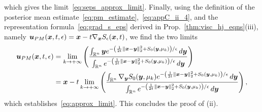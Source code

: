 \eeq
which gives the limit~\eqref{eq:seps_approx_limit}. Finally, using the definition of the posterior mean estimate~\eqref{eq:pm_estimate},~\eqref{eq:appC_ii_4}, and the representation formula~\eqref{eq:grad_s_eps} derived in Prop.~\ref{thm:visc_hj_eqns}(iii), namely $\boldsymbol{u}_{PM}(\boldsymbol{x},t,\epsilon) = \boldsymbol{x} - t\nabla_{\boldsymbol{x}}S_\epsilon(\boldsymbol{x},t)$, we find the two limits
\[
\begin{alignedat}{1}
\boldsymbol{u}_{PM}(\boldsymbol{x},t,\epsilon) &= \lim_{k\to +\infty} \left(\frac{\int_{\mathbb{R}^n} \boldsymbol{y} e^{-\left(\frac{1}{2t}\left\Vert \boldsymbol{x}-\boldsymbol{y}\right\Vert _{2}^{2}+S_0(\boldsymbol{y},\mu_k)\right)/\epsilon} \mathop{}\!d\boldsymbol{y}}{\int_{\mathbb{R}^n} e^{-\left(\frac{1}{2t}\left\Vert \boldsymbol{x}-\boldsymbol{y}\right\Vert _{2}^{2}+S_0(\boldsymbol{y},\mu_k)\right)/\epsilon} \mathop{}\!d\boldsymbol{y}}\right)\\
&= \boldsymbol{x} - t\lim_{k\to +\infty} \left(\frac{\int_{\mathbb{R}^n} \nabla_{\boldsymbol{y}}S_0(\boldsymbol{y},\mu_k)e^{-\left(\frac{1}{2t}\left\Vert \boldsymbol{x}-\boldsymbol{y}\right\Vert _{2}^{2}+S_0(\boldsymbol{y},\mu_k)\right)/\epsilon} \mathop{}\!d\boldsymbol{y}}{\int_{\mathbb{R}^n} e^{-\left(\frac{1}{2t}\left\Vert \boldsymbol{x}-\boldsymbol{y}\right\Vert _{2}^{2}+S_0(\boldsymbol{y},\mu_k)\right)/\epsilon} \mathop{}\!d\boldsymbol{y}}\right),
\end{alignedat}
\]
which establishes~\eqref{eq:approx_limit}. This concludes the proof of (ii).